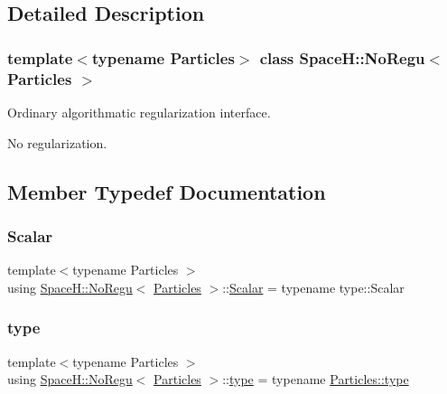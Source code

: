 \subsection{Detailed Description}
\subsubsection*{template$<$typename Particles$>$\newline
class Space\+H\+::\+No\+Regu$<$ Particles $>$}

Ordinary algorithmatic regularization interface. 

No regularization. 

\subsection{Member Typedef Documentation}
\mbox{\label{class_space_h_1_1_no_regu_a1b9ea47811c5f906727b791ba67ff458}} 
\subsubsection{\texorpdfstring{Scalar}{Scalar}}
{\footnotesize\ttfamily template$<$typename Particles $>$ \\
using \mbox{\hyperlink{class_space_h_1_1_no_regu}{Space\+H\+::\+No\+Regu}}$<$ \mbox{\hyperlink{struct_space_h_1_1_particles}{Particles}} $>$\+::\mbox{\hyperlink{class_space_h_1_1_no_regu_a1b9ea47811c5f906727b791ba67ff458}{Scalar}} =  typename type\+::\+Scalar}

\mbox{\label{class_space_h_1_1_no_regu_a0fc6770f1b6eab98e3b28e32ab8d2454}} 
\subsubsection{\texorpdfstring{type}{type}}
{\footnotesize\ttfamily template$<$typename Particles $>$ \\
using \mbox{\hyperlink{class_space_h_1_1_no_regu}{Space\+H\+::\+No\+Regu}}$<$ \mbox{\hyperlink{struct_space_h_1_1_particles}{Particles}} $>$\+::\mbox{\hyperlink{class_space_h_1_1_no_regu_a0fc6770f1b6eab98e3b28e32ab8d2454}{type}} =  typename \mbox{\hyperlink{class_space_h_1_1_vel_indep_particles_a09aa167b5fb1b203ab021220601ed74c}{Particles\+::type}}}



